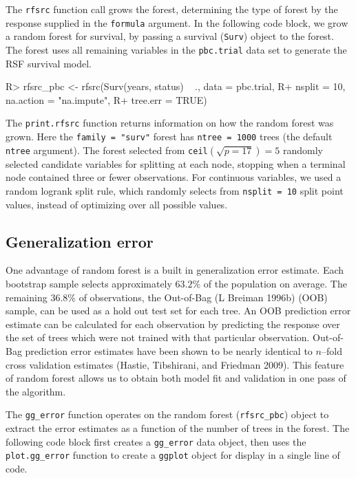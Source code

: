 \documentclass[article]{jss}
\begin{document}
The  \texttt{rfsrc} function call grows the forest,
determining the type of forest by the response supplied in the
\texttt{formula} argument. In the following code block, we grow a random
forest for survival, by passing a survival (\texttt{Surv}) object to the
forest. The forest uses all remaining variables in the
\texttt{pbc.trial} data set to generate the RSF survival model.

\begin{Schunk}
\begin{Sinput}
R> rfsrc_pbc <- rfsrc(Surv(years, status) ~ ., data = pbc.trial,
R+                    nsplit = 10, na.action = "na.impute", 
R+                    tree.err = TRUE)
\end{Sinput}
\end{Schunk}

The \texttt{print.rfsrc} function returns information on how the random
forest was grown. Here the \texttt{family\ =\ "surv"} forest has
\texttt{ntree\ =\ 1000} trees (the default \texttt{ntree} argument). The
forest selected from \texttt{ceil}\((\sqrt{p=17}) = 5\) randomly
selected candidate variables for splitting at each node, stopping when a
terminal node contained three or fewer observations. For continuous
variables, we used a random logrank split rule, which randomly selects
from \texttt{nsplit\ =\ 10} split point values, instead of optimizing
over all possible values.

\subsection{Generalization error}\label{generalization-error}

One advantage of random forest is a built in generalization error
estimate. Each bootstrap sample selects approximately \(63.2\%\) of the
population on average. The remaining \(36.8\%\) of observations, the
Out-of-Bag (L Breiman 1996b) (OOB) sample, can be used as a hold out
test set for each tree. An OOB prediction error estimate can be
calculated for each observation by predicting the response over the set
of trees which were not trained with that particular observation.
Out-of-Bag prediction error estimates have been shown to be nearly
identical to \(n\)--fold cross validation estimates (Hastie, Tibshirani,
and Friedman 2009). This feature of random forest allows us to obtain
both model fit and validation in one pass of the algorithm.

The \texttt{gg\_error} function operates on the random forest
(\texttt{rfsrc\_pbc}) object to extract the error estimates as a
function of the number of trees in the forest. The following code block
first creates a \texttt{gg\_error} data object, then uses the
\texttt{plot.gg\_error} function to create a \texttt{ggplot} object for
display in a single line of code.
\end{document}
